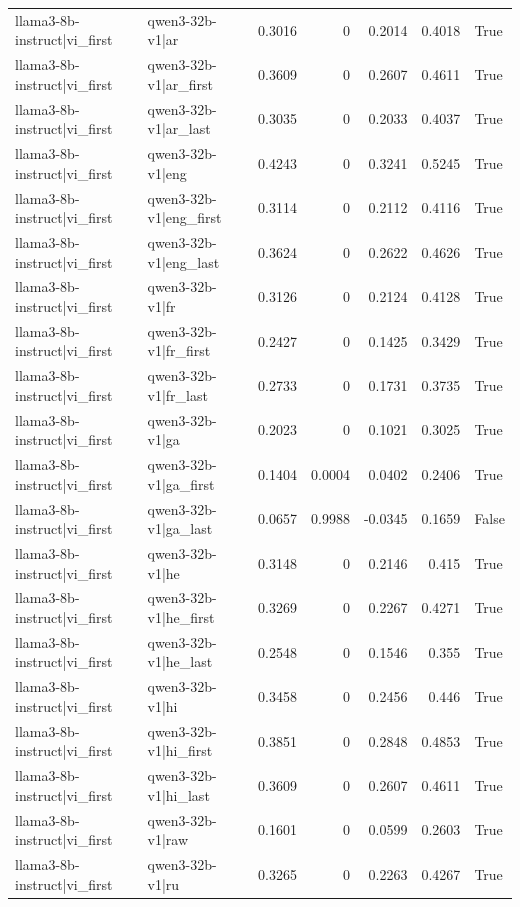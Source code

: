 \begin{table}
\begin{tabular}{l l r r r r l}
llama3-8b-instruct|vi_first & qwen3-32b-v1|ar & 0.3016 & 0 & 0.2014 & 0.4018 & True \\
llama3-8b-instruct|vi_first & qwen3-32b-v1|ar_first & 0.3609 & 0 & 0.2607 & 0.4611 & True \\
llama3-8b-instruct|vi_first & qwen3-32b-v1|ar_last & 0.3035 & 0 & 0.2033 & 0.4037 & True \\
llama3-8b-instruct|vi_first & qwen3-32b-v1|eng & 0.4243 & 0 & 0.3241 & 0.5245 & True \\
llama3-8b-instruct|vi_first & qwen3-32b-v1|eng_first & 0.3114 & 0 & 0.2112 & 0.4116 & True \\
llama3-8b-instruct|vi_first & qwen3-32b-v1|eng_last & 0.3624 & 0 & 0.2622 & 0.4626 & True \\
llama3-8b-instruct|vi_first & qwen3-32b-v1|fr & 0.3126 & 0 & 0.2124 & 0.4128 & True \\
llama3-8b-instruct|vi_first & qwen3-32b-v1|fr_first & 0.2427 & 0 & 0.1425 & 0.3429 & True \\
llama3-8b-instruct|vi_first & qwen3-32b-v1|fr_last & 0.2733 & 0 & 0.1731 & 0.3735 & True \\
llama3-8b-instruct|vi_first & qwen3-32b-v1|ga & 0.2023 & 0 & 0.1021 & 0.3025 & True \\
llama3-8b-instruct|vi_first & qwen3-32b-v1|ga_first & 0.1404 & 0.0004 & 0.0402 & 0.2406 & True \\
llama3-8b-instruct|vi_first & qwen3-32b-v1|ga_last & 0.0657 & 0.9988 & -0.0345 & 0.1659 & False \\
llama3-8b-instruct|vi_first & qwen3-32b-v1|he & 0.3148 & 0 & 0.2146 & 0.415 & True \\
llama3-8b-instruct|vi_first & qwen3-32b-v1|he_first & 0.3269 & 0 & 0.2267 & 0.4271 & True \\
llama3-8b-instruct|vi_first & qwen3-32b-v1|he_last & 0.2548 & 0 & 0.1546 & 0.355 & True \\
llama3-8b-instruct|vi_first & qwen3-32b-v1|hi & 0.3458 & 0 & 0.2456 & 0.446 & True \\
llama3-8b-instruct|vi_first & qwen3-32b-v1|hi_first & 0.3851 & 0 & 0.2848 & 0.4853 & True \\
llama3-8b-instruct|vi_first & qwen3-32b-v1|hi_last & 0.3609 & 0 & 0.2607 & 0.4611 & True \\
llama3-8b-instruct|vi_first & qwen3-32b-v1|raw & 0.1601 & 0 & 0.0599 & 0.2603 & True \\
llama3-8b-instruct|vi_first & qwen3-32b-v1|ru & 0.3265 & 0 & 0.2263 & 0.4267 & True \\

\end{tabular}
\end{table}
